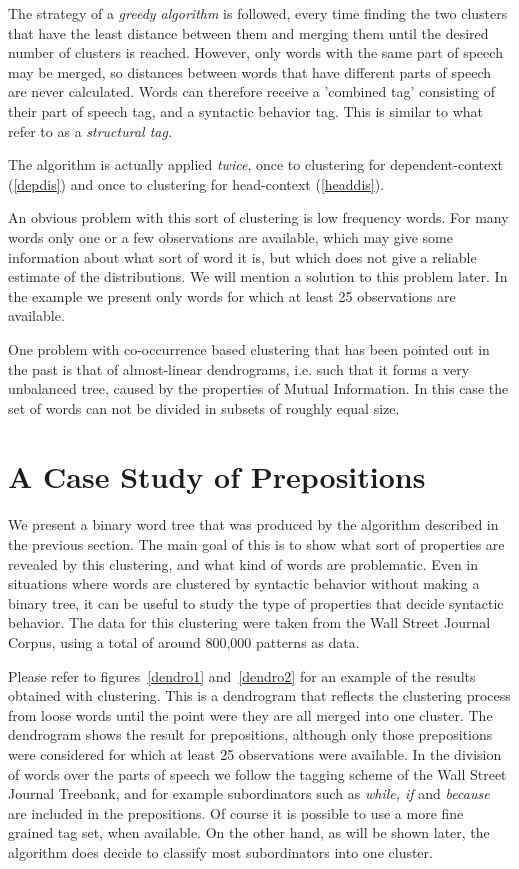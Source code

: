 The strategy of a {\em greedy algorithm} is followed, every time finding the two
clusters that have the least distance between them and merging them until the
desired number of clusters is reached. However, only words with the same part of
speech may be merged, so distances between words that have different parts of
speech are never calculated. Words can therefore receive a 'combined tag'
consisting of their part of speech tag, and a syntactic behavior tag.  This is
similar to what \cite{mcmahon96} refer to as a {\em structural
  tag.}

The algorithm is actually applied {\em twice}, once to clustering for
dependent-context (\ref{depdis}) and once to clustering for
head-context (\ref{headdis}).

An obvious problem with this sort of clustering is low frequency words.  For
many words only one or a few observations are available, which may give some
information about what sort of word it is, but which does not give a reliable
estimate of the distributions. We will mention a solution to this problem later.
In the example we present only words for which at least 25 observations are
available.

One problem with co-occurrence based clustering that has been pointed
out in the past is that of almost-linear dendrograms, i.e. such that
it forms a very unbalanced tree, caused by the properties of Mutual
Information.  In this case the set of words can not be divided in
subsets of roughly equal size.

\section{A Case Study of Prepositions}

We present a binary word tree that was produced by the algorithm described in
the previous section. The main goal of this is to show what sort of properties
are revealed by this clustering, and what kind of words are problematic.  Even
in situations where words are clustered by syntactic behavior without making a
binary tree, it can be useful to study the type of properties that decide
syntactic behavior.  The data for this clustering were taken from the Wall
Street Journal Corpus, using a total of around 800,000 patterns as data.

Please refer to figures~\ref{dendro1} and~\ref{dendro2} for an example of the
results obtained with clustering. This is a dendrogram that reflects the
clustering process from loose words until the point were they are all merged
into one cluster. The dendrogram shows the result for prepositions, although
only those prepositions were considered for which at least 25 observations were
available. In the division of words over the parts of speech we follow the
tagging scheme of the Wall Street Journal Treebank, and for example
subordinators such as {\em while, if} and {\em because} are included in the
prepositions.  Of course it is possible to use a more fine grained tag set, when
available. On the other hand, as will be shown later, the algorithm does decide
to classify most subordinators into one cluster.

